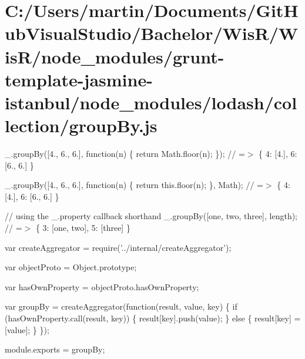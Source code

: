 \hypertarget{_c_1_2_users_2martin_2_documents_2_git_hub_visual_studio_2_bachelor_2_wis_r_2_wis_r_2node_modulebb2605923cf83369f244132dd77857ae}{}\section{C\+:/\+Users/martin/\+Documents/\+Git\+Hub\+Visual\+Studio/\+Bachelor/\+Wis\+R/\+Wis\+R/node\+\_\+modules/grunt-\/template-\/jasmine-\/istanbul/node\+\_\+modules/lodash/collection/group\+By.\+js}
\+\_\+.\+group\+By(\mbox{[}4., 6., 6.\mbox{]}, function(n) \{ return Math.\+floor(n); \}); // =$>$ \{ \textquotesingle{}4\textquotesingle{}\+: \mbox{[}4.\mbox{]}, \textquotesingle{}6\textquotesingle{}\+: \mbox{[}6., 6.\mbox{]} \}

\+\_\+.\+group\+By(\mbox{[}4., 6., 6.\mbox{]}, function(n) \{ return this.\+floor(n); \}, Math); // =$>$ \{ \textquotesingle{}4\textquotesingle{}\+: \mbox{[}4.\mbox{]}, \textquotesingle{}6\textquotesingle{}\+: \mbox{[}6., 6.\mbox{]} \}

// using the {\ttfamily \+\_\+.\+property} callback shorthand \+\_\+.\+group\+By(\mbox{[}\textquotesingle{}one\textquotesingle{}, \textquotesingle{}two\textquotesingle{}, \textquotesingle{}three\textquotesingle{}\mbox{]}, \textquotesingle{}length\textquotesingle{}); // =$>$ \{ \textquotesingle{}3\textquotesingle{}\+: \mbox{[}\textquotesingle{}one\textquotesingle{}, \textquotesingle{}two\textquotesingle{}\mbox{]}, \textquotesingle{}5\textquotesingle{}\+: \mbox{[}\textquotesingle{}three\textquotesingle{}\mbox{]} \}


\begin{DoxyCodeInclude}
var createAggregator = require(\textcolor{stringliteral}{'../internal/createAggregator'});

var objectProto = Object.prototype;

var hasOwnProperty = objectProto.hasOwnProperty;

var groupBy = createAggregator(\textcolor{keyword}{function}(result, value, key) \{
  \textcolor{keywordflow}{if} (hasOwnProperty.call(result, key)) \{
    result[key].push(value);
  \} \textcolor{keywordflow}{else} \{
    result[key] = [value];
  \}
\});

module.exports = groupBy;
\end{DoxyCodeInclude}
 